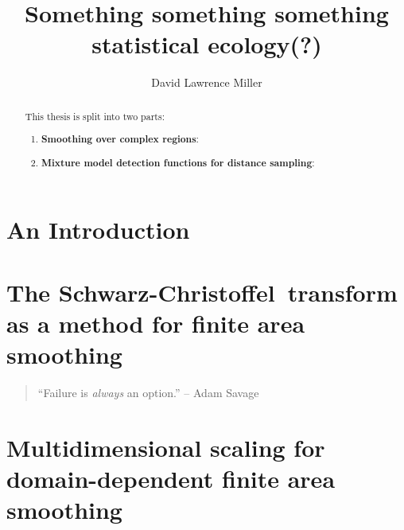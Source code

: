 \documentclass[mitthesis]{report}
\title{Something something something statistical ecology(?)}
\author{David Lawrence Miller}
\newcommand{\sch}{Schwarz-Christoffel}
\begin{document}
\maketitle
\begin{abstract} 
This thesis is split into two parts:
\begin{enumerate}
	\item \textbf{Smoothing over complex regions}:
	\item \textbf{Mixture model detection functions for distance sampling}:
\end{enumerate}
\end{abstract}



\tableofcontents

\listoffigures

\chapter{An Introduction}



\chapter{The \sch\ transform as a method for finite area smoothing}
\begin{quotation}
``Failure is \textit{always} an option.'' -- Adam Savage
\end{quotation}



\chapter{Multidimensional scaling for domain-dependent finite area smoothing}
\begin{quotation}
\end{quotation}


\end{document}
